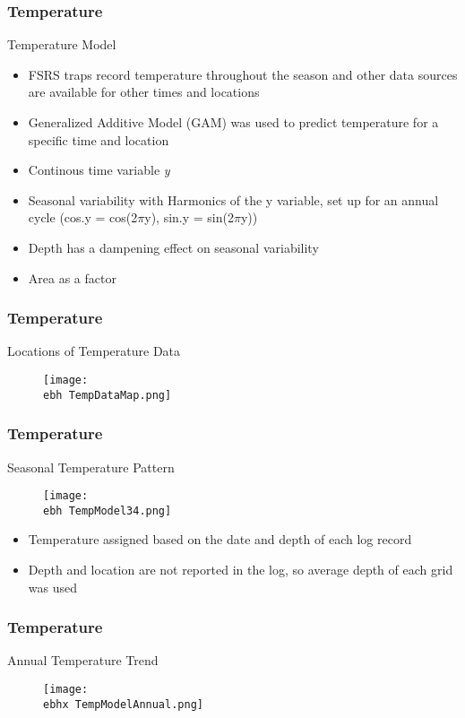\documentclass{beamer}
\newcommand{\ebh}{\string~/bio.data/bio.lobster/figures/LFA3438Framework2019/} %
\newcommand{\ebhx}{\string~/bio.data/bio.lobster/figures/LFA3438Framework2019/figures/Brad/} %
\begin{document}
\begin{frame}
\frametitle{Temperature}
Temperature Model
\begin{itemize}
\item FSRS traps record temperature throughout the season and other data sources are available for other times and locations 
\item Generalized Additive Model (GAM) was used to predict temperature for a specific time and location
\item Continous time variable \textit{y}
\item Seasonal variability with Harmonics of the y variable, set up for an annual cycle (cos.y = cos(2$\pi$y), sin.y = sin(2$\pi$y))
\item Depth has a dampening effect on seasonal variability
\item Area as a factor
\end{itemize}
\end{frame}


\begin{frame}
\frametitle{Temperature}
Locations of Temperature Data
\begin{figure}
        \begin{center}
            \texttt{[image: \\ebh TempDataMap.png]}
        \end{center}
    \end{figure}
\end{frame}

\begin{frame}
\frametitle{Temperature}
Seasonal Temperature Pattern
\begin{figure}
        \begin{center}
            \texttt{[image: \\ebh TempModel34.png]}
        \end{center}
    \end{figure}
\begin{itemize}
\item Temperature assigned based on the date and depth of each log record
\item Depth and location are not reported in the log, so average depth of each grid was used
\end{itemize}
\end{frame}

\begin{frame}
\frametitle{Temperature}
Annual Temperature Trend
\begin{figure}
        \begin{center}
            \texttt{[image: \\ebhx TempModelAnnual.png]}
        \end{center}
    \end{figure}
\end{frame}
\end{document}
